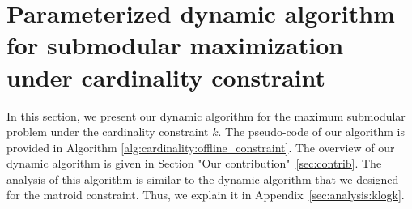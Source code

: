 \documentclass[11pt]{article}
\begin{document}
 

  














  



  
  
  
  
  
  






  


   
   

  










\section{Parameterized dynamic algorithm for submodular maximization under cardinality constraint}
\label{sec:klogk}
In this section, we present our dynamic algorithm for the maximum submodular problem under the cardinality constraint $k$.
The pseudo-code of our algorithm is provided in Algorithm \ref{alg:cardinality:offline_constraint}. 
The overview of our dynamic algorithm is given in Section "Our contribution"~\ref{sec:contrib}. 
The analysis of this algorithm is similar to the dynamic algorithm that we designed for the matroid constraint. 
Thus, we explain it in Appendix~\ref{sec:analysis:klogk}. 
\end{document}
